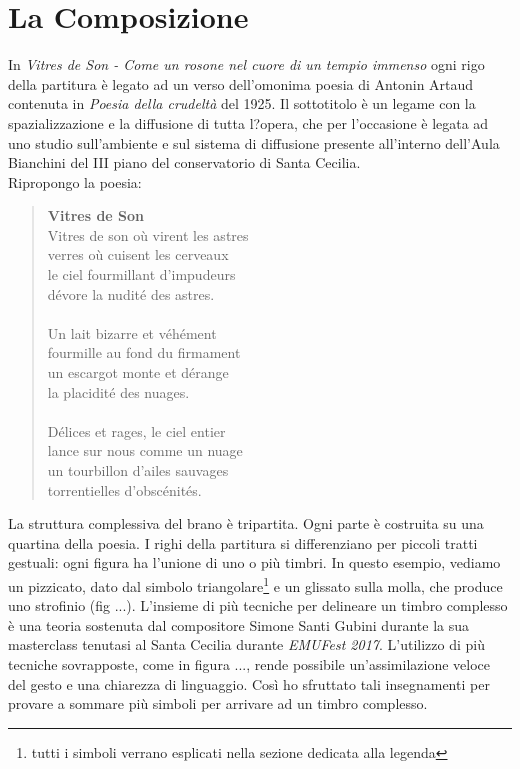 
\chapter{La Composizione}
\label{chp:La Composizione}
In \textit{Vitres de Son - Come un rosone nel cuore di un tempio immenso} ogni rigo della partitura è legato ad un verso dell'omonima poesia di Antonin Artaud contenuta in \textit{Poesia della crudeltà} del 1925. Il sottotitolo è un legame con la spazializzazione e la diffusione di tutta l?opera, che per l'occasione è legata ad uno studio sull'ambiente e sul sistema di diffusione presente all'interno dell'Aula Bianchini del III piano del conservatorio di Santa Cecilia. \\
Ripropongo la poesia:

\begin{quotation}
\textbf{Vitres de Son} \\
Vitres de son où virent les astres \\
verres où cuisent les cerveaux \\
le ciel fourmillant d'impudeurs \\
dévore la nudité des astres. \\ \\
Un lait bizarre et véhément \\
fourmille au fond du firmament \\
un escargot monte et dérange \\
la placidité des nuages. \\ \\
Délices et rages, le ciel entier \\
lance sur nous comme un nuage \\
un tourbillon d'ailes sauvages \\
torrentielles d'obscénités.\\
\end{quotation}

La struttura complessiva del brano è tripartita. Ogni parte è costruita su una quartina della poesia. I righi della partitura  si differenziano per piccoli tratti gestuali: ogni figura ha l'unione di uno o più timbri. In questo esempio, vediamo un pizzicato, dato dal simbolo triangolare\footnote{tutti i simboli verrano esplicati nella sezione dedicata alla legenda} e un glissato sulla molla, che produce uno strofinio (fig ...). L'insieme di più tecniche per delineare un timbro complesso è una teoria sostenuta dal compositore Simone Santi Gubini durante la sua masterclass tenutasi al Santa Cecilia durante \textit{EMUFest 2017}. L'utilizzo di più tecniche sovrapposte, come in figura ..., rende possibile un'assimilazione veloce del gesto e una chiarezza di linguaggio. Così ho sfruttato tali insegnamenti per provare a sommare più simboli per arrivare ad un timbro complesso.

